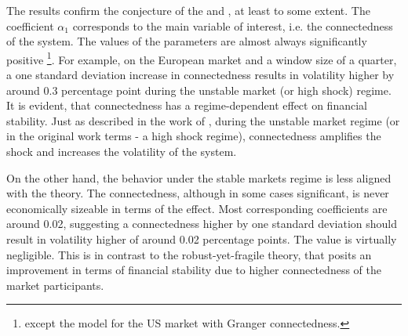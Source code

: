 \documentclass[12pt]{article}
\begin{document}
The results confirm the conjecture of the \citet{acemoglu13} and \citet{haldane13}, at least to some extent. The coefficient $\alpha_1$ corresponds to the main variable of interest, i.e. the connectedness of the system. The values of the parameters are almost always significantly positive \footnote{except the model for the US market with Granger connectedness.}. For example, on the European market and a window size of a quarter, a one standard deviation increase in connectedness results in volatility higher by around 0.3 percentage point during the unstable market (or high shock) regime. It is evident, that connectedness has a regime-dependent effect on financial stability. Just as described in the work of \citet{acemoglu13}, during the unstable market regime (or in the original work terms - a high shock regime), connectedness amplifies the shock and increases the volatility of the system. 

On the other hand, the behavior under the stable markets regime is less aligned with the theory. The connectedness, although in some cases significant, is never economically sizeable in terms of the effect. Most corresponding coefficients are around 0.02, suggesting a connectedness higher by one standard deviation should result in volatility higher of around 0.02 percentage points. The value is virtually negligible. This is in contrast to the robust-yet-fragile theory, that posits an improvement in terms of financial stability due to higher connectedness of the market participants.
\end{document}
